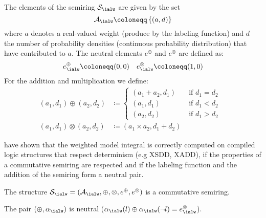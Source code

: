 \begin{example}

\end{example}


\begin{definition}
	The elements of the semiring $\mathcal{S}_{\ialw}$ are given by the set
	\begin{equation}\label{eqn:set_aws}
		\mathcal{A}_{\ialw}\coloneqq \left \{ (a, d) \right \}
	\end{equation}
	where $a$ denotes a real-valued weight (produce by the labeling function) and $d$ the number of probability densities (continuous probability distribution) that have contributed to $a$. The neutral elements $e^\oplus$ and $e^\otimes$ are defined as:
	\begin{align}
		e_{\ialw}^\oplus  \coloneqq (0,0)  &&
		e_{\ialw}^\otimes  \coloneqq (1,0)
	\end{align}
	For the addition and multiplication we define:
	\begin{align}
		(a_1,d_1) \oplus
		(a_2,d_2)
		&\coloneqq
		\begin{cases}
			(a_1+a_2,d_1) &\quad  \text{if $d_1=d_2$} \\
			(a_1,d_1) &\quad  \text{if $d_1<d_2$} \\
			(a_2,d_2) &\quad  \text{if $d_1>d_2$}
		\end{cases} \\
		(a_1,d_1) \otimes
		(a_2,d_2)
		&\coloneqq (a_1 \times a_2 , d_1+d_2)  &
	\end{align}
\end{definition}

\citet{zuidbergdosmartires2019exact} have shown that the weighted model integral is correctly computed on compiled logic structures that respect determinism (e.g XSDD, XADD), if the properties of a commutative semiring are respected and if the labeling function and the addition of the semiring form a neutral pair.

\begin{lemma} The structure $\mathcal{S}_{\ialw}=({\cal A}_{\ialw}, \oplus, \otimes, e^\oplus,e^\otimes)$ is a commutative semiring.
\end{lemma}	

\begin{lemma} The pair  $(\oplus, \alpha_{\ialw})$ is neutral ($\alpha_{\ialw}(l)\oplus \alpha_{\ialw}(\neg l) = e_{\ialw}^{\otimes}$).
\end{lemma}


